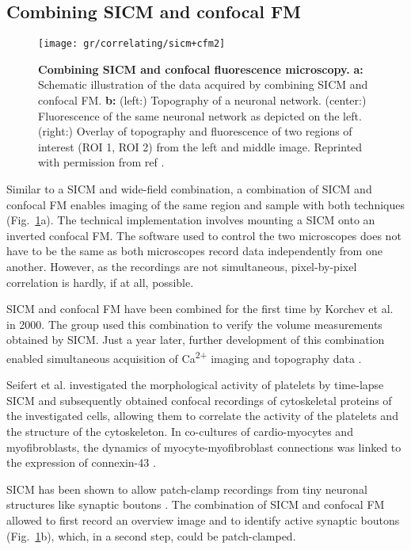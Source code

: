 \subsection{Combining SICM and confocal FM}

\begin{figure}
  \texttt{[image: gr/correlating/sicm+cfm2]}
  \caption{%
    \textbf{Combining SICM and confocal fluorescence microscopy.}
    \textbf{a:} Schematic illustration of the data acquired by combining SICM and confocal FM.
    \textbf{b:} 
    	(left:) Topography of a neuronal network.
    	(center:) Fluorescence of the same neuronal network as depicted on the left.
    	(right:) Overlay of topography and fluorescence of two regions of interest (ROI 1, ROI 2) from
    	the left and middle image.
    Reprinted with permission from ref \cite{Novak2013}.
  }
  \label{fig:sicm+cfm}
\end{figure}

Similar to a SICM and wide-field combination, a combination of SICM and
confocal FM enables imaging of the same region and sample with both techniques
(Fig.~\ref{fig:sicm+cfm}a). The technical implementation involves mounting a
SICM onto an inverted confocal FM. The software used to control the two
microscopes does not have to be the same as both microscopes record data
independently from one another. However, as the recordings are not
simultaneous, pixel-by-pixel correlation is hardly, if at all, possible.

SICM and confocal FM have been combined for the first time by Korchev et al.
\cite{Korchev2000} in 2000. The group used this combination to verify the
volume measurements obtained by SICM. Just a year later, further development
of this combination enabled simultaneous acquisition of Ca\textsuperscript{2+}
imaging and topography data \cite{Shevchuk2001}.

Seifert et al. \cite{Seifert2017} investigated the morphological activity of
platelets by time-lapse SICM and subsequently obtained confocal recordings of
cytoskeletal proteins of the investigated cells, allowing them to correlate
the activity of the platelets and the structure of the cytoskeleton.
In co-cultures of cardio-myocytes and myofibroblasts, the dynamics of
myocyte-myofibroblast connections was linked to the expression of connexin-43
\cite{Schultz2019}.


SICM has been shown to allow patch-clamp recordings from tiny neuronal
structures like synaptic boutons \cite{Novak2013}. The combination of SICM and
confocal FM allowed to first record an overview image and to identify active
synaptic boutons (Fig.~\ref{fig:sicm+cfm}b), which, in a second step, could be
patch-clamped.

